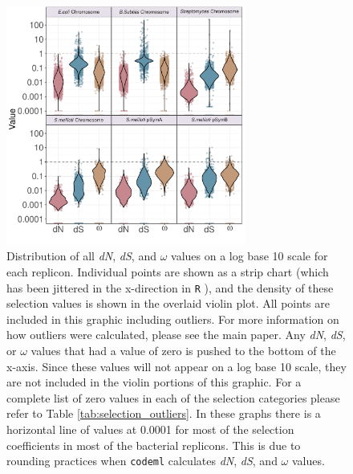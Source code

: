 \documentclass[11pt]{article}
\newcommand{\dn}{\textit{dN}\xspace}
\newcommand{\ds}{\textit{dS}\xspace}
\providecommand{\DIFaddbegin}{} %
\begin{document}
\DIFaddbegin \begin{figure}[h]
	\centering
	\includegraphics[width=0.7\textwidth]{./figs/ALL_BAC_dN_dS_omega_violinplots_22Sep20.pdf}
	\caption{\label{fig:box_plots}Distribution of all \dn, \ds, and $\omega$ values on a log base 10 scale for each replicon. Individual points are shown as a strip chart (which has been jittered in the x-direction in \texttt{R} \citep{Wickham2019}
), and the density of these selection values is shown in the overlaid violin plot. All points are included in this graphic including outliers. For more information on how outliers were calculated, please see the main paper. Any \dn, \ds, or $\omega$ values that had a value of zero is pushed to the bottom of the x-axis. Since these values will not appear on a log base 10 scale, they are not included in the violin portions of this graphic. For a complete list of zero values in each of the selection categories please refer to Table \ref{tab:selection_outliers}. In these graphs there is a horizontal line of values at 0.0001 for most of the selection coefficients in most of the bacterial replicons. This is due to rounding practices when \texttt{codeml} \citep{Yang97}
calculates \dn, \ds, and $\omega$ values.}
\end{figure}
\end{document}
